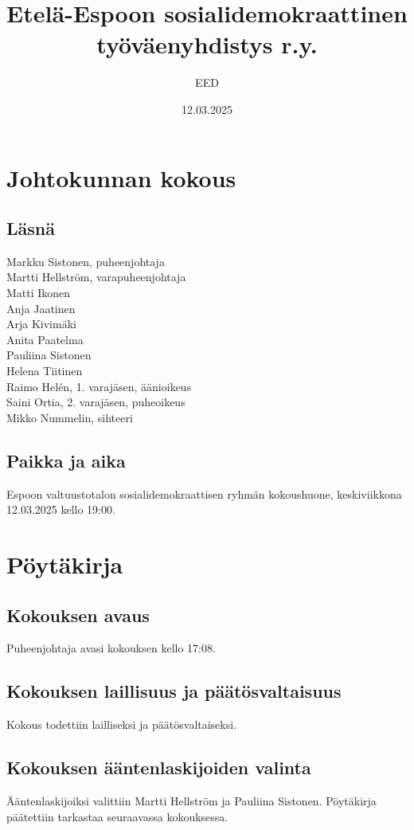 \documentclass[a4paper,12pt]{article}
\title{Etelä-Espoon sosialidemokraattinen työväenyhdistys r.y.}
\author{EED}
\date{12.03.2025}
\begin{document}
\maketitle
\tableofcontents
\section*{Johtokunnan kokous}
\subsection*{Läsnä}
\begin{flushleft}
  Markku Sistonen, puheenjohtaja \\
  Martti Hellström, varapuheenjohtaja \\
  Matti Ikonen \\
  Anja Jaatinen \\
  Arja Kivimäki \\
  Anita Paatelma \\
  Pauliina Sistonen \\
  Helena Tiitinen \\
  Raimo Helén, 1. varajäsen, äänioikeus \\
  Saini Ortia, 2. varajäsen, puheoikeus \\
  Mikko Nummelin, sihteeri
\end{flushleft}
\subsection*{Paikka ja aika}
Espoon valtuustotalon sosialidemokraattisen ryhmän kokoushuone, keskiviikkona 12.03.2025 kello 19:00.
\section*{Pöytäkirja}
\subsection{Kokouksen avaus}
Puheenjohtaja avasi kokouksen kello 17:08.
\subsection{Kokouksen laillisuus ja päätösvaltaisuus}
Kokous todettiin lailliseksi ja päätösvaltaiseksi.
\subsection{Kokouksen ääntenlaskijoiden valinta}
Ääntenlaskijoiksi valittiin Martti Hellström ja Pauliina Sistonen. Pöytäkirja päätettiin tarkastaa seuraavassa kokouksessa.
\end{document}
